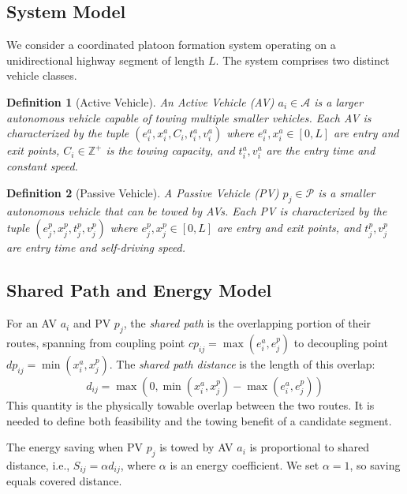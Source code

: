 \documentclass[conference]{IEEEtran}
\newtheorem{definition}{Definition}
\begin{document}
\subsection{System Model}

We consider a coordinated platoon formation system operating on a unidirectional highway segment of length $L$. The system comprises two distinct vehicle classes.

\begin{definition}[Active Vehicle]
An Active Vehicle (AV) $a_i \in \mathcal{A}$ is a larger autonomous vehicle capable of towing multiple smaller vehicles. Each AV is characterized by the tuple $(e_i^a, x_i^a, C_i, t_i^a, v_i^a)$ where $e_i^a, x_i^a \in [0, L]$ are entry and exit points, $C_i \in \mathbb{Z}^+$ is the towing capacity, and $t_i^a, v_i^a$ are the entry time and constant speed.
\end{definition}

\begin{definition}[Passive Vehicle]
A Passive Vehicle (PV) $p_j \in \mathcal{P}$ is a smaller autonomous vehicle that can be towed by AVs. Each PV is characterized by the tuple $(e_j^p, x_j^p, t_j^p, v_j^p)$ where $e_j^p, x_j^p \in [0, L]$ are entry and exit points, and $t_j^p, v_j^p$ are entry time and self-driving speed.
\end{definition}

\subsection{Shared Path and Energy Model}

For an AV $a_i$ and PV $p_j$, the \textit{shared path} is the overlapping portion of their routes, spanning from coupling point $cp_{ij} = \max(e_i^a, e_j^p)$ to decoupling point $dp_{ij} = \min(x_i^a, x_j^p)$. The \textit{shared path distance} is the length of this overlap:
\begin{equation}
    d_{ij} = \max(0, \min(x_i^a, x_j^p) - \max(e_i^a, e_j^p))
    \label{eq:shared}
\end{equation}
This quantity is the physically towable overlap between the two routes. It is needed to define both feasibility and the towing benefit of a candidate segment.

The energy saving when PV $p_j$ is towed by AV $a_i$ is proportional to shared distance, i.e., $S_{ij} = \alpha d_{ij}$, where $\alpha$ is an energy coefficient. We set $\alpha = 1$, so saving equals covered distance.
\end{document}
